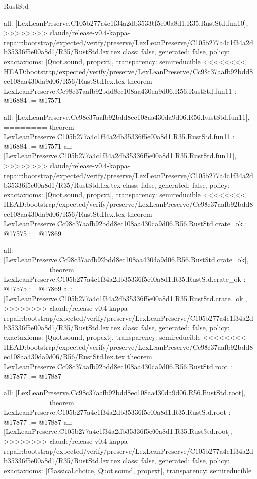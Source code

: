 \begin{lexlean}{RustStd}
\begin{coremodule}
{\begin{coremodule}
{{{{{{{{{{{{{{  all: [LexLeanPreserve.C105b277a4c1f34a2db35336f5e00a8d1.R35.RustStd.fun10],
>>>>>>>> claude/release-v0.4-kappa-repair:bootstrap/expected/verify/preserve/LexLeanPreserve/C105b277a4c1f34a2db35336f5e00a8d1/R35/RustStd.lex.tex
  class: false,
  generated: false,
  policy: exact{axioms: [Quot.sound, propext]},
  transparency: semireducible
}
<<<<<<<< HEAD:bootstrap/expected/verify/preserve/LexLeanPreserve/Cc98c37aafb92bdd8ec108aa430da9d06/R56/RustStd.lex.tex
theorem LexLeanPreserve.Cc98c37aafb92bdd8ec108aa430da9d06.R56.RustStd.fun11 : @16884 := @17571 {
  all: [LexLeanPreserve.Cc98c37aafb92bdd8ec108aa430da9d06.R56.RustStd.fun11],
========
theorem LexLeanPreserve.C105b277a4c1f34a2db35336f5e00a8d1.R35.RustStd.fun11 : @16884 := @17571 {
  all: [LexLeanPreserve.C105b277a4c1f34a2db35336f5e00a8d1.R35.RustStd.fun11],
>>>>>>>> claude/release-v0.4-kappa-repair:bootstrap/expected/verify/preserve/LexLeanPreserve/C105b277a4c1f34a2db35336f5e00a8d1/R35/RustStd.lex.tex
  class: false,
  generated: false,
  policy: exact{axioms: [Quot.sound, propext]},
  transparency: semireducible
}
<<<<<<<< HEAD:bootstrap/expected/verify/preserve/LexLeanPreserve/Cc98c37aafb92bdd8ec108aa430da9d06/R56/RustStd.lex.tex
theorem LexLeanPreserve.Cc98c37aafb92bdd8ec108aa430da9d06.R56.RustStd.crate_ok : @17575 := @17869 {
  all: [LexLeanPreserve.Cc98c37aafb92bdd8ec108aa430da9d06.R56.RustStd.crate_ok],
========
theorem LexLeanPreserve.C105b277a4c1f34a2db35336f5e00a8d1.R35.RustStd.crate_ok : @17575 := @17869 {
  all: [LexLeanPreserve.C105b277a4c1f34a2db35336f5e00a8d1.R35.RustStd.crate_ok],
>>>>>>>> claude/release-v0.4-kappa-repair:bootstrap/expected/verify/preserve/LexLeanPreserve/C105b277a4c1f34a2db35336f5e00a8d1/R35/RustStd.lex.tex
  class: false,
  generated: false,
  policy: exact{axioms: [Quot.sound, propext]},
  transparency: semireducible
}
<<<<<<<< HEAD:bootstrap/expected/verify/preserve/LexLeanPreserve/Cc98c37aafb92bdd8ec108aa430da9d06/R56/RustStd.lex.tex
theorem LexLeanPreserve.Cc98c37aafb92bdd8ec108aa430da9d06.R56.RustStd.root : @17877 := @17887 {
  all: [LexLeanPreserve.Cc98c37aafb92bdd8ec108aa430da9d06.R56.RustStd.root],
========
theorem LexLeanPreserve.C105b277a4c1f34a2db35336f5e00a8d1.R35.RustStd.root : @17877 := @17887 {
  all: [LexLeanPreserve.C105b277a4c1f34a2db35336f5e00a8d1.R35.RustStd.root],
>>>>>>>> claude/release-v0.4-kappa-repair:bootstrap/expected/verify/preserve/LexLeanPreserve/C105b277a4c1f34a2db35336f5e00a8d1/R35/RustStd.lex.tex
  class: false,
  generated: false,
  policy: exact{axioms: [Classical.choice, Quot.sound, propext]},
  transparency: semireducible
}

}}}}}}}}}}}}}}}}
\end{coremodule}}
\end{coremodule}
\end{lexlean}
